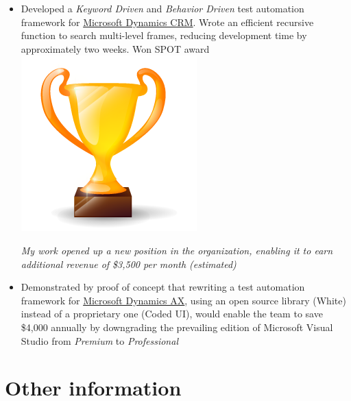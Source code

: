 \documentclass[a4paper]{tenseconds} %
\begin{document}
\begin{twenty}
        {}
        {
        \begin{itemize}
        \item Developed a \textit{Keyword Driven} and \textit{Behavior Driven} test automation framework for \href{https://www.microsoft.com/en-ca/dynamics/crm.aspx}{Microsoft Dynamics CRM}. Wrote an efficient recursive function to search multi-level frames, reducing development time by approximately two weeks. Won SPOT award {\includegraphics[scale=0.05]{img/trophy.png}}
        
        \textit{My work opened up a new position in the organization, enabling it to earn additional revenue of \$3,500 per month (estimated)}
        \item Demonstrated by proof of concept that rewriting a test automation framework for \href{https://www.microsoft.com/en-ca/dynamics/erp-ax-overview.aspx}{Microsoft Dynamics AX}, using an open source library (White) instead of a proprietary one (Coded UI), would enable the team to save \$4,000 annually by downgrading the prevailing edition of Microsoft Visual Studio from \textit{Premium} to \textit{Professional}
    \end{itemize}
        }
 

        
\end{twenty}


\newpage %

\makesecondprofile %

\section{Other information}
\end{document}
